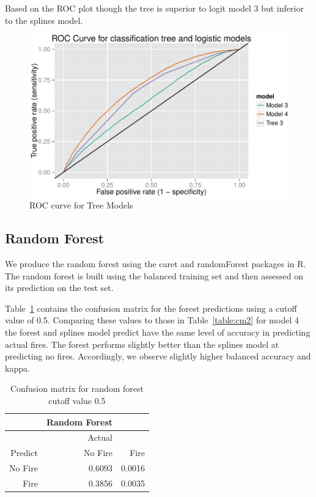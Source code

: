 \documentclass[11pt,a4paper]{article}
\begin{document}

Based on the ROC plot though the tree is superior to logit model 3 but inferior to the splines model.


\begin{figure}
  \centering
	\includegraphics[width=.8\textwidth]{figures/trees_roc.pdf}
  \caption{ROC curve for Tree Models}
  \label{fig:troc}
\end{figure}


\subsection{Random Forest}

We produce the random forest using the caret and randomForest packages \citep{caret, rf} in R. The random forest is built using the balanced training set and then assessed on its prediction on the test set.

Table~\ref{table:cmrf} contains the confusion matrix for the forest predictions using a cutoff value of 0.5. Comparing these values to those in Table~\ref{table:cm2} for model 4 the forest and splines model predict have the same level of accuracy in predicting actual fires. The forest performs slightly better than the splines model at predicting no fires. Accordingly, we observe slightly higher balanced accuracy and kappa.

\begin{table}
  \centering
  \begin{tabular}{rrr}
    \toprule
            & Random Forest & \\
    \midrule
            & Actual        & \\
    Predict & No Fire       & Fire \\
    \midrule
    No Fire & 0.6093        & 0.0016 \\
    Fire    & 0.3856        & 0.0035 \\
    \bottomrule
  \end{tabular}
  \caption{Confusion matrix for random forest cutoff value 0.5}
  \label{table:cmrf}
\end{table}
\end{document}
